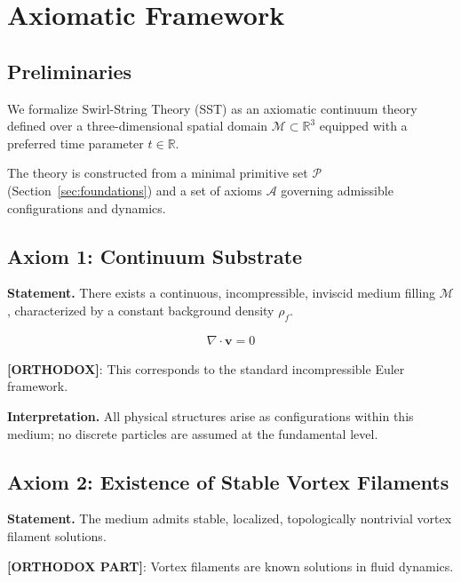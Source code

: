 \section{Axiomatic Framework}
    \label{sec:axioms}
    
    \subsection{Preliminaries}
        
        We formalize Swirl-String Theory (SST) as an axiomatic continuum theory defined over a three-dimensional spatial domain $\mathcal{M} \subset \mathbb{R}^3$ equipped with a preferred time parameter $t \in \mathbb{R}$.
        
        The theory is constructed from a minimal primitive set $\mathcal{P}$ (Section~\ref{sec:foundations}) and a set of axioms $\mathcal{A}$ governing admissible configurations and dynamics.
    
    \subsection{Axiom 1: Continuum Substrate}
        
        \textbf{Statement.}
        There exists a continuous, incompressible, inviscid medium filling $\mathcal{M}$, characterized by a constant background density $\rho_f$.
        
        \begin{align}
            \nabla \cdot \mathbf{v} = 0
        \end{align}
        
        \textbf{[ORTHODOX]}: This corresponds to the standard incompressible Euler framework.
        
        \textbf{Interpretation.}
        All physical structures arise as configurations within this medium; no discrete particles are assumed at the fundamental level.
    
    \subsection{Axiom 2: Existence of Stable Vortex Filaments}
        
        \textbf{Statement.}
        The medium admits stable, localized, topologically nontrivial vortex filament solutions.
        
        \textbf{[ORTHODOX PART]}: Vortex filaments are known solutions in fluid dynamics.
        

